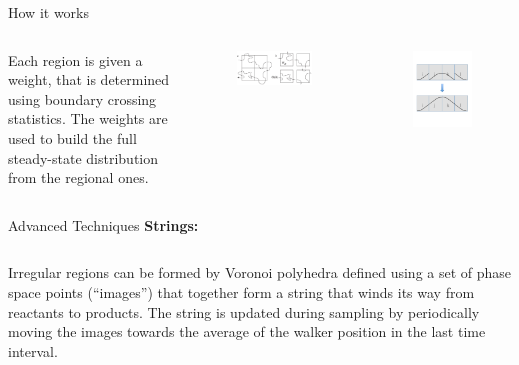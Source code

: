 \documentclass[final]{beamer}
\begin{document}
\begin{columns}[t]
\begin{column}{.33\linewidth}
\begin{block}{How it works}
	  \begin{columns}[t]
	    \begin{column}{.4\linewidth}
	      Each region is given a weight, that is determined using boundary crossing statistics.
	      The weights are used to build the full steady-state distribution from the regional ones.
	    \end{column}
	    \begin{column}{.25\linewidth}
	      \begin{figure}
		\includegraphics[width=3 in]{images/motivation2.pdf}
	      \end{figure}
	    \end{column}
	    \begin{column}{.25\linewidth}
	      \begin{figure}
		\includegraphics[width=2 in]{images/patch.pdf}
	      \end{figure}
	    \end{column}
	  \end{columns}

        \end{block}
	\begin{block}{Advanced Techniques}
	  \textbf{Strings:}

	  \begin{columns}[t]
	    \begin{column}{.65\linewidth}

	  Irregular regions can be formed by Voronoi polyhedra defined using a set of phase space points (``images'') that together form a string that winds its way from reactants to products.
	  The string is updated during sampling by periodically moving the images towards the average of the walker position in the last time interval.


\end{column}
\end{columns}
\end{block}
\end{column}
\end{columns}
\end{document}
